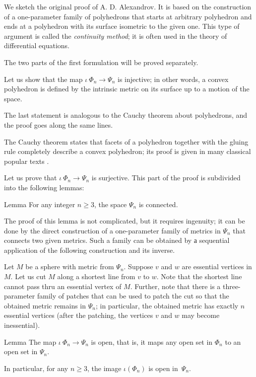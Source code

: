 \documentclass[oneside,a4paper]{article}
\begin{document}
We sketch the original proof of A. D. Alexandrov.
It is based on the  construction of a one-parameter family of polyhedrons that starts at arbitrary polyhedron
and ends at a polyhedron with its surface isometric to the given one.
This type of argument is called the \emph{continuity method}; it is often used in the theory of differential equations.

\medskip

The two parts of the first formulation will be proved separately.

 Let us show that the map $\iota\:\Phi_n\to\Psi_n$ is injective;
in other words, a convex polyhedron is defined by the intrinsic metric on its surface up to a motion of the space.

The last statement is analogous to the Cauchy theorem about polyhedrons,
and the proof goes along the same lines. 

The Cauchy theorem states that facets of a polyhedron together with the gluing rule completely describe a convex polyhedron;
its proof is given in many classical popular texts \cite{aigner-zigler,dolbilin,tabacnikov-fuks}.

\medskip

Let us prove that $\iota\:\Phi_n\to\Psi_n$ is surjective.
This part of the proof is subdivided into the following lemmas:

\begin{thm}{Lemma}
For any integer $n\ge 3$, the space $\Psi_n$ is connected.
\end{thm}

The proof of this lemma is not complicated, but it requires ingenuity;
it can be done by the direct construction of a one-parameter family of metrics in $\Psi_n$ that connects two given metrics.
Such a family can be obtained by а sequential application of the following construction and its inverse.

Let $M$ be a sphere with metric from $\Psi_n$.
Suppose $v$ and $w$ are essential vertices in $M$.
Let us cut $M$ along a shortest line from $v$ to $w$.
Note that the shortest line cannot pass thru an essential vertex of $M$.
Further, note that there is a three-parameter family of patches that can be used to patch the cut so that the obtained metric remains in $\Psi_n$;
in particular, the obtained metric has exactly $n$ essential vertices (after the patching, the vertices $v$ and $w$ may become inessential).


\begin{thm}{Lemma}
The map $\iota\:\Phi_n\to\Psi_n$ is open, 
that is, it maps any open set in $\Phi_n$ to an open set in $\Psi_n$.

In particular, for any $n\ge 3$, the image $\iota(\Phi_n)$ is open in~$\Psi_n$.
\end{thm}
\end{document}
